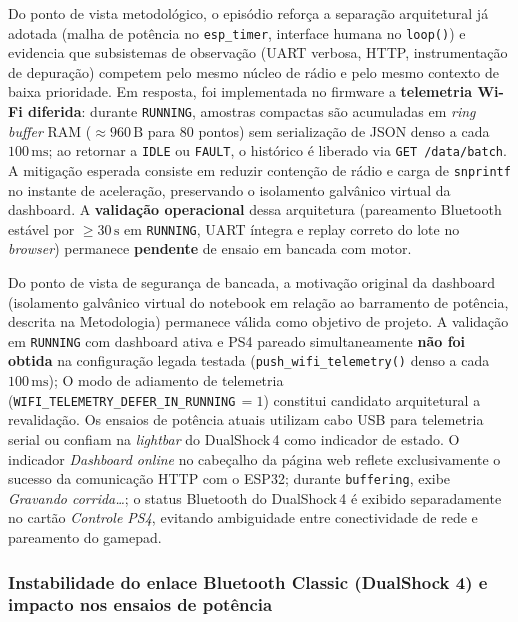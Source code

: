 Do ponto de vista metodológico, o episódio reforça a separação arquitetural já adotada (malha de potência no \texttt{esp\_timer}, interface humana no \texttt{loop()}) e evidencia que subsistemas de observação (UART verbosa, HTTP, instrumentação de depuração) competem pelo mesmo núcleo de rádio e pelo mesmo contexto de baixa prioridade. Em resposta, foi implementada no firmware a \textbf{telemetria Wi-Fi diferida}: durante \texttt{RUNNING}, amostras compactas são acumuladas em \textit{ring buffer} RAM ($\approx 960\,\text{B}$ para $80$ pontos) sem serialização de JSON denso a cada $100\,\text{ms}$; ao retornar a \texttt{IDLE} ou \texttt{FAULT}, o histórico é liberado via \texttt{GET /data/batch}. A mitigação esperada consiste em reduzir contenção de rádio e carga de \texttt{snprintf} no instante de aceleração, preservando o isolamento galvânico virtual da dashboard. A \textbf{validação operacional} dessa arquitetura (pareamento Bluetooth estável por $\geq 30\,\text{s}$ em \texttt{RUNNING}, UART íntegra e replay correto do lote no \textit{browser}) permanece \textbf{pendente} de ensaio em bancada com motor.

Do ponto de vista de segurança de bancada, a motivação original da dashboard (isolamento galvânico virtual do notebook em relação ao barramento de potência, descrita na Metodologia) permanece válida como objetivo de projeto. A validação em \texttt{RUNNING} com dashboard ativa e PS4 pareado simultaneamente \textbf{não foi obtida} na configuração legada testada (\texttt{push\_wifi\_telemetry()} denso a cada $100\,\text{ms}$); O modo de adiamento de telemetria (\texttt{WIFI\_TELEMETRY\_DEFER\_IN\_RUNNING}\,$= 1$) constitui candidato arquitetural a revalidação. Os ensaios de potência atuais utilizam cabo USB para telemetria serial ou confiam na \textit{lightbar} do DualShock\,4 como indicador de estado. O indicador \textit{Dashboard online} no cabeçalho da página web reflete exclusivamente o sucesso da comunicação HTTP com o ESP32; durante \texttt{buffering}, exibe \textit{Gravando corrida…}; o status Bluetooth do DualShock\,4 é exibido separadamente no cartão \textit{Controle PS4}, evitando ambiguidade entre conectividade de rede e pareamento do gamepad.

\subsubsection{Instabilidade do enlace Bluetooth Classic (DualShock 4) e impacto nos ensaios de potência}
\label{subsubsec:bugs_bluetooth_ps4}


